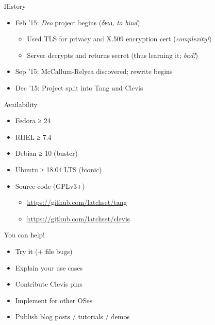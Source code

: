 \documentclass[ignorenonframetext,aspectratio=169]{beamer}
\begin{document}
\begin{frame}{History}
\protect\hypertarget{history}{}

\begin{itemize}
\item Feb '15: \emph{Deo} project begins (\emph{δεω, to bind})

  \begin{itemize}
  \item Used TLS for privacy and X.509 encryption cert (\emph{complexity!})
  \item Server decrypts and returns secret (thus learning it; \emph{bad!})
  \end{itemize}
\item Sep '15: McCallum-Relyea discovered; rewrite begins
\item Dec '15: Project split into Tang and Clevis
\end{itemize}

\end{frame}

\begin{frame}[fragile]{Availability}
\protect\hypertarget{availability}{}

\begin{itemize}
\item Fedora ≥ 24
\item RHEL ≥ 7.4
\item Debian ≥ 10 (buster)
\item Ubuntu ≥ 18.04 LTS (bionic)
\item Source code (GPLv3+)

  \begin{itemize}
  \item \url{https://github.com/latchset/tang}
  \item \url{https://github.com/latchset/clevis}
  \end{itemize}
\end{itemize}

\end{frame}

\begin{frame}{You can help!}
\protect\hypertarget{you-can-help}{}

\begin{itemize}
\item Try it (+ file bugs)
\item Explain your use cases
\item Contribute Clevis pins
\item Implement for other OSes
\item Publish blog posts / tutorials / demos
\end{itemize}

\end{frame}
\end{document}
